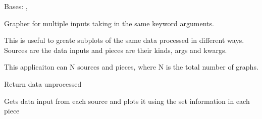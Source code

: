 \documentclass[letterpaper,10pt,english]{sphinxmanual}
\begin{document}
\begin{fulllineitems}
\label{\detokenize{dalio.application:dalio.application.MultiGrapher}}
Bases: {\hyperref[\detokenize{dalio.application:dalio.application.application.Application}]{}}, 

Grapher for multiple inputs taking in the same keyword arguments.

This is useful to greate subplots of the same data processed in
different ways. Sources are the data inputs and pieces are their kinds,
args and kwargs.

This applicaiton can N sources and pieces, where N is the total number of
graphs.

\begin{fulllineitems}
\label{\detokenize{dalio.application:dalio.application.MultiGrapher.build_model}}
Return data unprocessed

\end{fulllineitems}


\begin{fulllineitems}
\label{\detokenize{dalio.application:dalio.application.MultiGrapher.run}}
Gets data input from each source and plots it using the set
information in each piece

\end{fulllineitems}


\end{fulllineitems}

\end{document}
